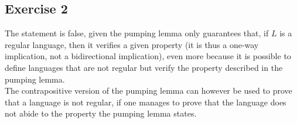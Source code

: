 \documentclass[docid=PA06]{tcom_PA}
\begin{document}
{\subsection{Exercise 2}
The statement is false, given the pumping lemma only guarantees that, if $L$ is a regular language, then it verifies a given property (it is thus a one-way implication, not a bidirectional implication), even more because it is possible to define languages that are not regular but verify the property described in the pumping lemma.\\
The contrapositive version of the pumping lemma can however be used to prove that a language is not regular, if one manages to prove that the language does not abide to the property the pumping lemma states.
}
\end{document}
